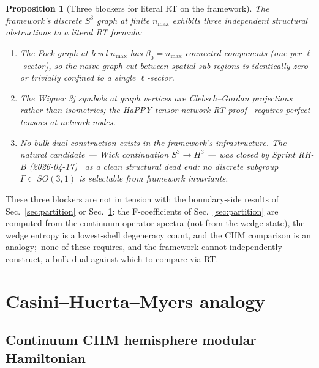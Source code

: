 \documentclass[11pt,a4paper]{article}
\theoremstyle{plain}
\newtheorem{proposition}[theorem]{Proposition}
\theoremstyle{definition}
\newcommand{\nmax}{n_{\max}}
\newcommand{\sthree}{S^{3}}
\begin{document}
\begin{proposition}[Three blockers for literal RT on the framework]
\label{prop:RT_blocked}
The framework's discrete $\sthree$ graph at finite $\nmax$ exhibits
three independent structural obstructions to a literal RT formula:
\begin{enumerate}
\item The Fock graph at level $\nmax$ has $\beta_{0} = \nmax$
connected components (one per $\ell$-sector), so the naive
graph-cut between spatial sub-regions is identically zero or
trivially confined to a single $\ell$-sector.

\item The Wigner 3j symbols at graph vertices are Clebsch--Gordan
projections rather than isometries; the HaPPY tensor-network
RT proof~\cite{pastawski_yoshida_harlow_preskill2015} requires
perfect tensors at network nodes.

\item No bulk-dual construction exists in the framework's
infrastructure. The natural candidate --- Wick continuation
$\sthree \to H^{3}$ --- was closed by Sprint RH-B
(2026-04-17)~\cite{paper29} as a clean structural dead end: no
discrete subgroup $\Gamma \subset SO(3,1)$ is selectable from
framework invariants.
\end{enumerate}
\end{proposition}

These three blockers are not in tension with the boundary-side
results of Sec.~\ref{sec:partition} or Sec.~\ref{sec:chm}: the
F-coefficients of Sec.~\ref{sec:partition} are computed from the
continuum operator spectra (not from the wedge state), the wedge entropy is a
lowest-shell degeneracy count, and the CHM comparison is an analogy;\
none of these requires, and the framework cannot independently construct,
a bulk dual against which to compare via RT.

\section{Casini--Huerta--Myers analogy}
\label{sec:chm}

\subsection{Continuum CHM hemisphere modular Hamiltonian}
\end{document}
